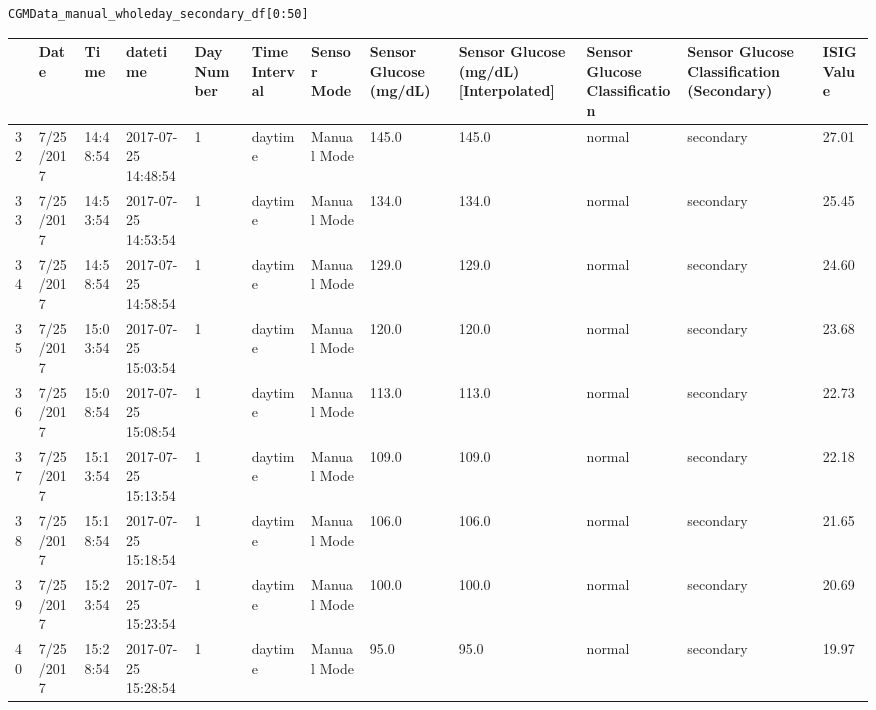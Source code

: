 \bigskip

\begin{verbatim}
CGMData_manual_wholeday_secondary_df[0:50]
\end{verbatim}

\bigskip\noindent
\begin{tabular}{p{}p{}p{}p{}p{}p{}p{}p{}p{}p{}p{}p{}}
\toprule
 & Date & Time & datetime & Day Number & Time Interval & Sensor Mode & Sensor Glucose (mg/dL) & Sensor Glucose (mg/dL) [Interpolated] & Sensor Glucose Classification & Sensor Glucose Classification (Secondary) & ISIG Value \\
\hline
32 & 7/25/2017 & 14:48:54 & 2017-07-25 14:48:54 & 1 & daytime & Manual Mode & 145.0 & 145.0 & normal & secondary & 27.01 \\
\hline
33 & 7/25/2017 & 14:53:54 & 2017-07-25 14:53:54 & 1 & daytime & Manual Mode & 134.0 & 134.0 & normal & secondary & 25.45 \\
\hline
34 & 7/25/2017 & 14:58:54 & 2017-07-25 14:58:54 & 1 & daytime & Manual Mode & 129.0 & 129.0 & normal & secondary & 24.60 \\
\hline
35 & 7/25/2017 & 15:03:54 & 2017-07-25 15:03:54 & 1 & daytime & Manual Mode & 120.0 & 120.0 & normal & secondary & 23.68 \\
\hline
36 & 7/25/2017 & 15:08:54 & 2017-07-25 15:08:54 & 1 & daytime & Manual Mode & 113.0 & 113.0 & normal & secondary & 22.73 \\
\hline
37 & 7/25/2017 & 15:13:54 & 2017-07-25 15:13:54 & 1 & daytime & Manual Mode & 109.0 & 109.0 & normal & secondary & 22.18 \\
\hline
38 & 7/25/2017 & 15:18:54 & 2017-07-25 15:18:54 & 1 & daytime & Manual Mode & 106.0 & 106.0 & normal & secondary & 21.65 \\
\hline
39 & 7/25/2017 & 15:23:54 & 2017-07-25 15:23:54 & 1 & daytime & Manual Mode & 100.0 & 100.0 & normal & secondary & 20.69 \\
\hline
40 & 7/25/2017 & 15:28:54 & 2017-07-25 15:28:54 & 1 & daytime & Manual Mode & 95.0 & 95.0 & normal & secondary & 19.97 \\

\end{tabular}
